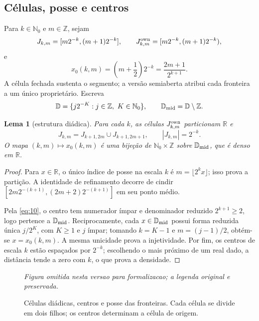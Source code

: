 \documentclass[11pt,a4paper]{article}
\theoremstyle{preciso}
\newtheorem{lema}[teorema]{Lema}
\theoremstyle{definition}
\newcommand{\N}{\mathbb N}
\newcommand{\Z}{\mathbb Z}
\newcommand{\R}{\mathbb R}
\newcommand{\D}{\mathbb D}
\newcommand{\eqn}[2]{\begin{equation}\label{eq:#1}#2\end{equation}}
\newcommand{\figura}[4]{\begin{figure}[!htbp]\centering
 \emph{Figura omitida nesta versao para formalizacao; a legenda original e preservada.}
 \caption{#3}\label{fig:#4}\end{figure}}
\begin{document}
\subsection{Células, posse e centros}
Para $k\in\N_0$ e $m\in\Z$, sejam
\eqn{09}{J_{k,m}=[m2^{-k},(m+1)2^{-k}],\qquad J_{k,m}^{\rm own}=[m2^{-k},(m+1)2^{-k}),}
e
\eqn{10}{x_0(k,m)=\left(m+\frac12\right)2^{-k}=\frac{2m+1}{2^{k+1}}.}
A célula fechada sustenta o segmento; a versão semiaberta atribui cada fronteira a um único proprietário. Escreva
\[
\D=\{j2^{-K}:j\in\Z,\ K\in\N_0\},\qquad \D_{\rm mid}=\D\setminus\Z.
\]
\begin{lema}[estrutura diádica]
Para cada $k$, as células $J_{k,m}^{\rm own}$ particionam $\R$ e
\eqn{11}{J_{k,m}=J_{k+1,2m}\cup J_{k+1,2m+1},\qquad |J_{k,m}|=2^{-k}.}
O mapa $(k,m)\mapsto x_0(k,m)$ é uma bijeção de $\N_0\times\Z$ sobre $\D_{\rm mid}$, que é denso em $\R$.
\end{lema}
\begin{proof}
Para $x\in\R$, o único índice de posse na escala $k$ é $m=\lfloor2^kx\rfloor$; isso prova a partição. A identidade de refinamento decorre de cindir $[2m2^{-(k+1)},(2m+2)2^{-(k+1)}]$ em seu ponto médio.

Pela \eqref{eq:10}, o centro tem numerador ímpar e denominador reduzido $2^{k+1}\ge2$, logo pertence a $\D_{\rm mid}$. Reciprocamente, cada $x\in\D_{\rm mid}$ possui forma reduzida única $j/2^K$, com $K\ge1$ e $j$ ímpar; tomando $k=K-1$ e $m=(j-1)/2$, obtém-se $x=x_0(k,m)$. A mesma unicidade prova a injetividade. Por fim, os centros de escala $k$ estão espaçados por $2^{-k}$; escolhendo o mais próximo de um real dado, a distância tende a zero com $k$, o que prova a densidade.
\end{proof}
\figura{02_celulas}{.92}{Células diádicas, centros e posse das fronteiras. Cada célula se divide em dois filhos; os centros determinam a célula de origem.}{celulas}
\end{document}
